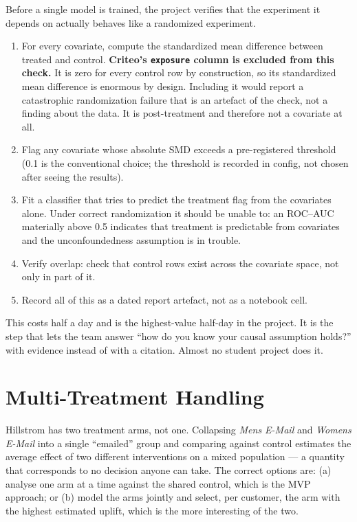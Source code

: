 \documentclass[11pt,a4paper]{article}
\begin{document}
Before a single model is trained, the project verifies that the experiment it depends on actually
behaves like a randomized experiment.

\begin{enumerate}
\item For every covariate, compute the standardized mean difference between treated and control.
\textbf{Criteo's \texttt{exposure} column is excluded from this check.} It is zero for every control
row by construction, so its standardized mean difference is enormous by design. Including it would
report a catastrophic randomization failure that is an artefact of the check, not a finding about
the data. It is post-treatment and therefore not a covariate at all.
\item Flag any covariate whose absolute SMD exceeds a pre-registered threshold (0.1 is the
conventional choice; the threshold is recorded in config, not chosen after seeing the results).
\item Fit a classifier that tries to predict the treatment flag from the covariates alone. Under
correct randomization it should be unable to: an ROC--AUC materially above 0.5 indicates that
treatment is predictable from covariates and the unconfoundedness assumption is in trouble.
\item Verify overlap: check that control rows exist across the covariate space, not only in
part of it.
\item Record all of this as a dated report artefact, not as a notebook cell.
\end{enumerate}

\begin{goodbox}
This costs half a day and is the highest-value half-day in the project. It is the step that lets
the team answer ``how do you know your causal assumption holds?'' with evidence instead of with a
citation. Almost no student project does it.
\end{goodbox}

\section{Multi-Treatment Handling}
\label{sec:multiarm}

\begin{alertbox}
Hillstrom has two treatment arms, not one. Collapsing \emph{Mens E-Mail} and \emph{Womens E-Mail}
into a single ``emailed'' group and comparing against control estimates the average effect of two
different interventions on a mixed population --- a quantity that corresponds to no decision anyone
can take. The correct options are: (a) analyse one arm at a time against the shared control, which
is the MVP approach; or (b) model the arms jointly and select, per customer, the arm with the
highest estimated uplift, which is the more interesting of the two.
\end{alertbox}
\end{document}
